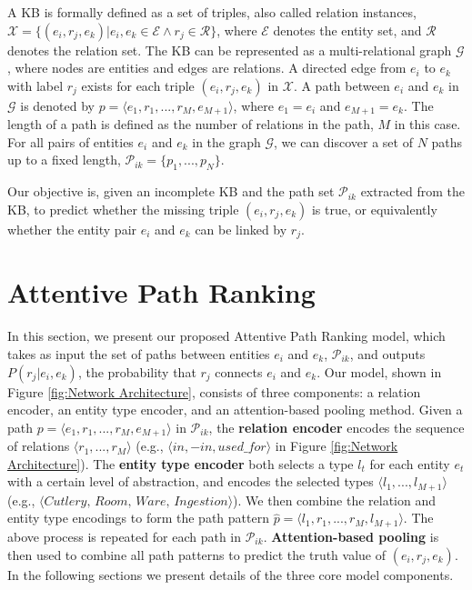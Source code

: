 \documentclass[letterpaper]{article} %
\begin{document}
A KB is formally defined as a set of triples, also called relation instances, $\mathcal{X} = \{ (e_i, r_j, e_k)|e_i, e_k\in \mathcal{E} \land  r_j \in \mathcal{R} \}$, where $\mathcal{E}$ denotes the entity set, and $\mathcal{R}$ denotes the relation set. The KB can be represented as a multi-relational graph $\mathcal{G}$, where nodes are entities and edges are relations. A directed edge from $e_i$ to $e_k$ with label $r_j$ exists for each triple $(e_i, r_j, e_k)$ in $\mathcal{X}$.
A path between $e_i$ and $e_k$ in $\mathcal{G}$ is denoted by $p = \langle e_1,r_1,...,r_M,e_{M+1}\rangle$, where $e_1 = e_i$ and $e_{M+1} = e_k$. The length of a path is defined as the number of relations in the path, $M$ in this case. For all pairs of entities $e_i$ and $e_k$ in the graph $\mathcal{G}$, we can discover a set of $N$ paths up to a fixed length, $\mathcal{P}_{ik} = \{ p_1,...,p_N \}$.

Our objective is, given an incomplete KB and the path set $\mathcal{P}_{ik}$ extracted from the KB, to predict whether the missing triple $(e_i, r_j, e_k)$ is true, or equivalently whether the entity pair $e_i$ and $e_k$ can be linked by $r_j$.



\section{Attentive Path Ranking}

In this section, we present our proposed Attentive Path Ranking model, which takes as input the set of paths between entities $e_i$ and $e_k$, $\mathcal{P}_{ik}$, and outputs $P(r_j|e_i, e_k)$, the probability that $r_j$ connects $e_i$ and $e_k$. Our model, shown in Figure \ref{fig:Network Architecture}, consists of three components: a relation encoder, an entity type encoder, and an attention-based pooling method. Given a path $p = \langle e_1,r_1,...,r_M,e_{M+1}\rangle$ in $\mathcal{P}_{ik}$, the \textbf{relation encoder} encodes the sequence of relations $\langle r_1,...,r_M\rangle$ (e.g., $\langle in, -in, used\_for \rangle$ in Figure \ref{fig:Network Architecture}). The \textbf{entity type encoder} both selects a type $l_t$ for each entity $e_t$ with a certain level of abstraction, and encodes the selected types $\langle l_1,...,l_{M+1} \rangle$ (e.g., $\langle Cutlery,\, Room,\, Ware,\, Ingestion \rangle$). We then combine the relation and entity type encodings to form the path pattern $\hat{p} = \langle l_1,r_1,...,r_M,l_{M+1}\rangle$. The above process is repeated for each path in $\mathcal{P}_{ik}$. \textbf{Attention-based pooling} is then used to combine all path patterns to predict the truth value of $(e_i, r_j, e_k)$.
In the following sections we present details of the three core model components.
\end{document}
